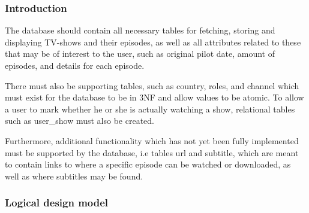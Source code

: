 \subsubsection{Introduction}
The database should contain all necessary tables for fetching, storing and displaying TV-shows and their episodes, as well as all attributes related to these that may be of interest to the user, such as original pilot date, amount of episodes, and details for each episode. 

There must also be supporting tables, such as country, roles, and channel  which must exist for the database to be in 3NF and allow values to be atomic. To allow a user to mark whether he or she is actually watching a show, relational tables such as user\_show must also be created.

Furthermore, additional functionality which has not yet been fully implemented must be supported by the database, i.e tables url and subtitle, which are meant to contain links to where a specific episode can be watched or downloaded, as well as where subtitles may be found. 

\subsubsection{Logical design model}

